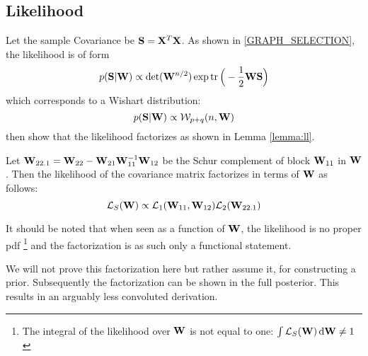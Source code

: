 \subsection{Likelihood}
Let the sample Covariance be $\mathbf{S} = \mathbf{X}^T\mathbf{X}$.
As shown in \autoref{GRAPH_SELECTION}, the likelihood is of form
\begin{equation}
\label{eq:BMB_likelihood}
p(\mathbf{S}|\mathbf{W}) \propto \det(\mathbf{W}^{n/2}) \exp\operatorname{tr}\Big(-\frac{1}{2} \mathbf{WS}\Big)
\end{equation}
 which corresponds to a Wishart distribution:
$$
p(\mathbf{S}|\mathbf{W}) \propto \mathcal{W}_{p+q}(n,\mathbf{W})
$$
\citet{kaufmann_bayesian_2015} then show that the likelihood factorizes as shown in Lemma \autoref{lemma:ll}.

\begin{tcolorbox}[colback=yellow!5!white,colframe=yellow!75!black]
	\begin{customlemma}{1}[\cite{kaufmann_bayesian_2015}]
		\label{lemma:ll}
		Let $\mathbf{W}_{22.1} = \mathbf{W}_{22} - \mathbf{W}_{21}\mathbf{W}_{11}^{-1}\mathbf{W}_{12}$ be the Schur complement of block $\mathbf{W}_{11}$ in $\mathbf{W}$.
		Then the likelihood of the covariance matrix factorizes in terms of $\mathbf{W}$ as follows:
		$$
		\mathcal{L}_S(\mathbf{W}) \propto \mathcal{L}_1(\mathbf{W}_{11}, \mathbf{W}_{12})\mathcal{L}_2(\mathbf{W}_{22.1})
		$$
	\end{customlemma}
\end{tcolorbox}
It should be noted that when seen as a function of $\mathbf{W}$, the likelihood is no proper \gls{pdf} 
\footnote{The integral of the likelihood over $\mathbf{W}$ is not equal to one: $\int \mathcal{L}_S(\mathbf{W}) \mathop{}\!\mathrm{d}\mathbf{W} \neq 1$} 
and the factorization is as such only a functional statement.

We will not prove this factorization here but rather assume it, for constructing a prior. 
Subsequently the factorization can be shown in the full posterior.
This results in an arguably less convoluted derivation.

